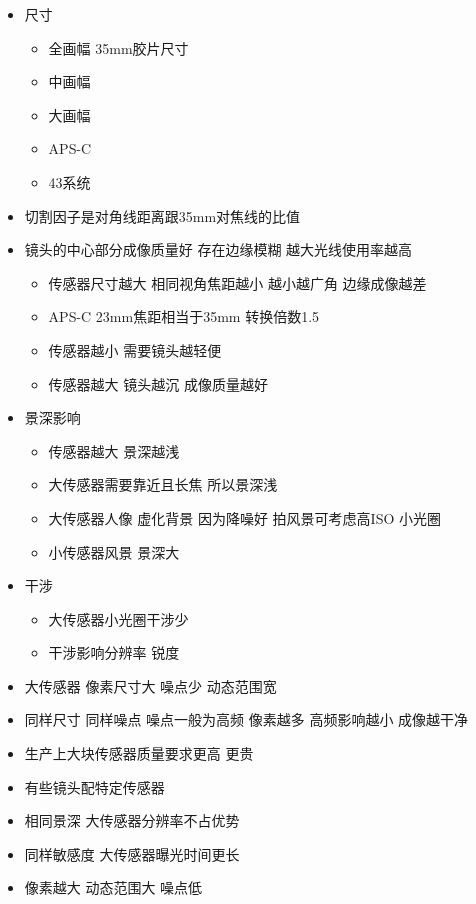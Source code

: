 \documentclass[
  letterpaper,
  DIV=11,
  numbers=noendperiod]{scrreprt}
\providecommand{\tightlist}{%
  \setlength{\itemsep}{0pt}\setlength{\parskip}{0pt}}\usepackage{longtable,booktabs,array}
\begin{document}
\begin{itemize}
\tightlist
\item
  尺寸

  \begin{itemize}
  \tightlist
  \item
    全画幅 35mm胶片尺寸
  \item
    中画幅
  \item
    大画幅
  \item
    APS-C
  \item
    43系统
  \end{itemize}
\item
  切割因子是对角线距离跟35mm对焦线的比值
\item
  镜头的中心部分成像质量好 存在边缘模糊 越大光线使用率越高

  \begin{itemize}
  \tightlist
  \item
    传感器尺寸越大 相同视角焦距越小 越小越广角 边缘成像越差
  \item
    APS-C 23mm焦距相当于35mm 转换倍数1.5
  \item
    传感器越小 需要镜头越轻便
  \item
    传感器越大 镜头越沉 成像质量越好
  \end{itemize}
\item
  景深影响

  \begin{itemize}
  \tightlist
  \item
    传感器越大 景深越浅
  \item
    大传感器需要靠近且长焦 所以景深浅
  \item
    大传感器人像 虚化背景 因为降噪好 拍风景可考虑高ISO 小光圈
  \item
    小传感器风景 景深大
  \end{itemize}
\item
  干涉

  \begin{itemize}
  \tightlist
  \item
    大传感器小光圈干涉少
  \item
    干涉影响分辨率 锐度
  \end{itemize}
\item
  大传感器 像素尺寸大 噪点少 动态范围宽
\item
  同样尺寸 同样噪点 噪点一般为高频 像素越多 高频影响越小 成像越干净
\item
  生产上大块传感器质量要求更高 更贵
\item
  有些镜头配特定传感器
\item
  相同景深 大传感器分辨率不占优势
\item
  同样敏感度 大传感器曝光时间更长
\item
  像素越大 动态范围大 噪点低
\end{itemize}
\end{document}
